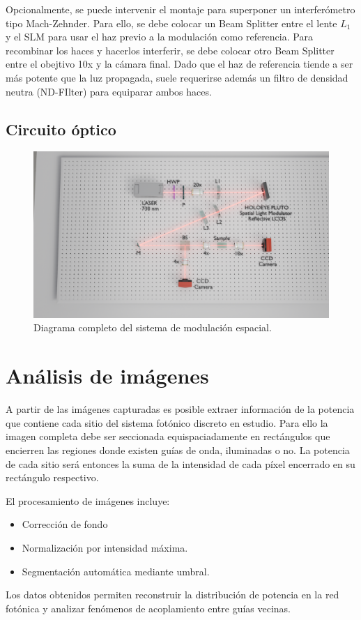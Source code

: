 Opcionalmente, se puede intervenir el montaje para superponer un interferómetro tipo Mach-Zehnder. Para ello, se debe colocar un Beam Splitter entre el lente $L_1$ y el SLM para usar el haz previo a la modulación como referencia. Para recombinar los haces y hacerlos interferir, se debe colocar otro Beam Splitter entre el obejtivo 10x y la cámara final. Dado que el haz de referencia tiende a ser más potente que la luz propagada, suele requerirse además un filtro de densidad neutra (ND-FIlter) para equiparar ambos haces.

\subsection{Circuito óptico}
\begin{figure}[H]
    \centering
    \includegraphics[width=\linewidth, trim={21cm 5cm 7cm 5cm},clip]{media/SLM_setupv1}
    \caption{Diagrama completo del sistema de modulación espacial.}
\end{figure}

\section{Análisis de imágenes \label{sec:analimag}}
A partir de las imágenes capturadas es posible extraer información de la potencia que contiene cada sitio del sistema fotónico discreto en estudio. Para ello la imagen completa debe ser seccionada equispaciadamente en rectángulos que encierren las regiones donde existen guías de onda, iluminadas o no. La potencia de cada sitio será entonces la suma de la intensidad de cada píxel encerrado en su rectángulo respectivo.

El procesamiento de imágenes incluye:
\begin{itemize}
    \item Corrección de fondo
    \item Normalización por intensidad máxima.
    \item Segmentación automática mediante umbral.
\end{itemize}

Los datos obtenidos permiten reconstruir la distribución de potencia en la red fotónica y analizar fenómenos de acoplamiento entre guías vecinas.